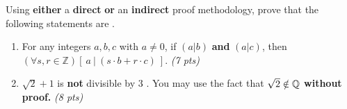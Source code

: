 \documentclass[letterpaper,10pt]{article}
\begin{document}

\vspace{-.65in}


{\large Using {\bf either} a \textbf{direct} {\bf or} an {\bf indirect} proof methodology, prove that the following statements are \True. 
\begin{enumerate}[label=(\alph*)]
	\item For any integers {\Large $a,b,c$} with {\Large $a \neq 0$}, if {\Large $(a \vert b)$} \textbf{and} {\Large $(a \vert c)$}, then {\Large $(\forall s, r \in \mathbb{Z})[\ a\ \vert\ (s\cdot b +r \cdot c)\ ]$.} {\em (7 pts)}
	\item  {\Large $\sqrt 2 + 1$} is {\bf not} divisible by {\Large  $3$ }. You may use the fact  that {\Large $\sqrt2 \notin \mathbb{Q}$} {\bf without proof.} \em (8 pts)
\end{enumerate}
} \vspace{-.4in}
\end{document}
